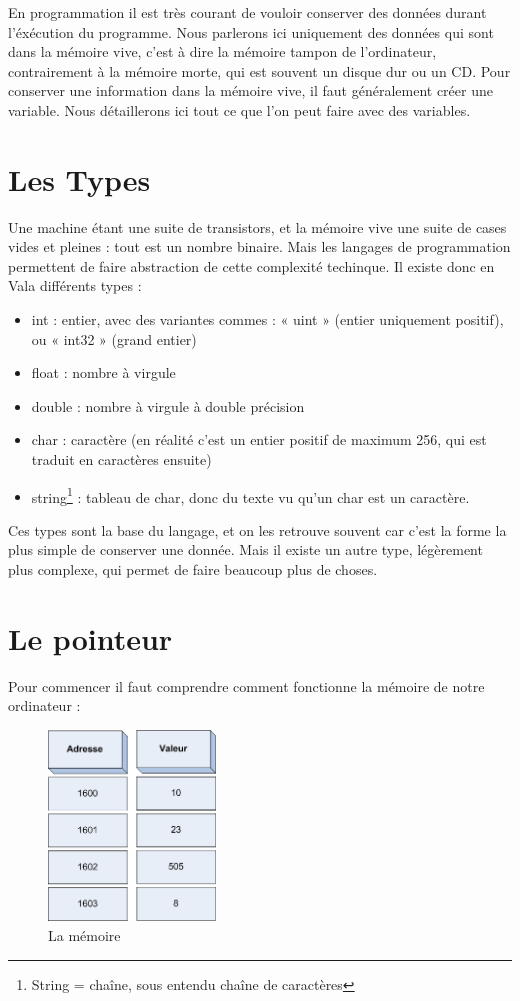 En programmation il est très courant de vouloir conserver des données durant l'éxécution du programme.
Nous parlerons ici uniquement des données qui sont dans la mémoire vive, c'est à dire la mémoire tampon 
de l'ordinateur, contrairement à la mémoire morte, qui est souvent un disque dur ou un CD.
Pour conserver une information dans la mémoire vive, il faut généralement créer une variable. Nous détaillerons 
ici tout ce que l'on peut faire avec des variables.

\section{Les Types}
Une machine étant une suite de transistors, et la mémoire vive une suite de cases vides et pleines :
tout est un nombre binaire. Mais les langages de programmation permettent de faire abstraction de cette complexité techinque.
Il existe donc en Vala différents types : 
\begin{itemize}
  \item int : entier, avec des variantes commes : « uint » (entier uniquement positif), ou « int32 » (grand entier)
  \item float : nombre à virgule 
  \item double : nombre à virgule à double précision
  \item char : caractère (en réalité c'est un entier positif de maximum 256, qui est traduit en caractères ensuite)
  \item string\footnote{String = chaîne, sous entendu chaîne de caractères} : tableau de char, donc du texte vu qu'un char est un caractère.
\end{itemize}

Ces types sont la base du langage, et on les retrouve souvent car c'est la forme la plus simple de conserver une donnée.
Mais il existe un autre type, légèrement plus complexe, qui permet de faire beaucoup plus de choses.

\section{Le pointeur}
Pour commencer il faut comprendre comment fonctionne la mémoire de notre ordinateur : 
\begin{figure}[H]
  \begin{center}
	  \includegraphics[width=12em]{Annexes/Images/tableau.png}
	\end{center}
	\caption{La mémoire}
\end{figure}

